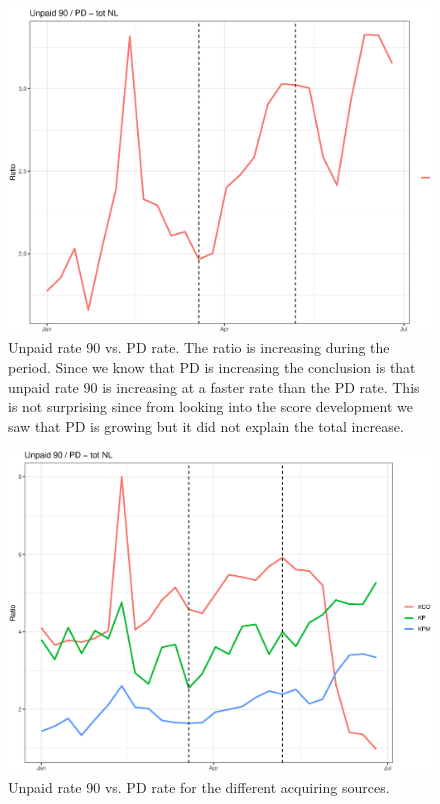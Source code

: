 
\begin{figure}[!ht]
  \centering
  \includegraphics[width=5in,trim={0 0 0 0},clip]{content/figures/unp90pd_dev_nl.eps} 
  \caption{Unpaid rate 90 vs. PD rate. The ratio is increasing during the period. Since we know that PD is increasing the conclusion is that unpaid rate 90 is increasing at a faster rate than the PD rate. This is not surprising since from looking into the score development we saw that PD is growing but it did not explain the total increase.}
  \label{fig:unp90pd_dev}
\end{figure}

\begin{figure}[!ht]
  \centering
  \includegraphics[width=5in,trim={0 0 0 0},clip]{content/figures/unp90pd_dev_nl_as.eps} 
  \caption{Unpaid rate 90 vs. PD rate for the different acquiring sources.}
  \label{fig:unp90pd_dev_as}
\end{figure}


